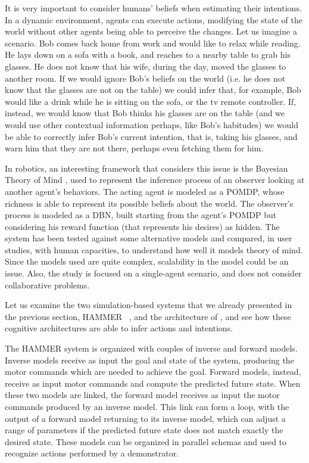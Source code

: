 It is very important to consider humans' beliefs when estimating their intentions. In a dynamic environment, agents can execute actions, modifying the state of the world without other agents being able to perceive the changes. Let us imagine a scenario. Bob comes back home from work and would like to relax while reading. He lays down on a sofa with a book, and reaches to a nearby table to grab his glasses. He does not know that his wife, during the day, moved the glasses to another room. If we would ignore Bob's beliefs on the world (i.e. he does not know that the glasses are not on the table) we could infer that, for example, Bob would like a drink while he is sitting on the sofa, or the tv remote controller. If, instead, we would know that Bob thinks his glasses are on the table (and we would use other contextual information perhaps, like Bob's habitudes) we would be able to correctly infer Bob's current intention, that is, taking his glasses, and warn him that they are not there, perhaps even fetching them for him. 

In robotics, an interesting framework that considers this issue is the Bayesian Theory of Mind \cite{baker2014modeling}, used to represent the inference process of an observer looking at another agent's behaviors. The acting agent is modeled as a POMDP, whose richness is able to represent its possible beliefs about the world. The observer's process is modeled as a DBN, built starting from the agent's POMDP but considering his reward function (that represents his desires) as hidden. The system has been tested against some alternative models and compared, in user studies, with human capacities, to understand how well it models theory of mind. Since the models used are quite complex, scalability in the model could be an issue. Also, the study is focused on a single-agent scenario, and does not consider collaborative problems.

Let us examine the two simulation-based systems that we already presented in the previous section, HAMMER ~\cite{demiris2007prediction}, and the architecture of \cite{BreazealGB09}, and see how these cognitive architectures are able to infer actions and intentions.

The HAMMER system is organized with couples of inverse and forward models.  Inverse models receive as input the goal and state of the system, producing the motor commands which are needed to achieve the goal. Forward models, instead, receive as input motor commands and compute the predicted future state. When these two models are linked, the forward model receives as input the motor commands produced by an inverse model. This link can form a loop, with the output of a forward model returning to its inverse model, which can adjust a range of parameters if the predicted future state does not match exactly the desired state. These models can be organized in parallel schemas and used to recognize actions performed by a demonstrator. 

